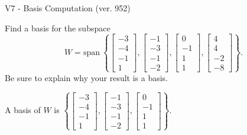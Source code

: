 \begin{exercise}
  \begin{exerciseTitle}V7 - Basis Computation (ver. 952)\end{exerciseTitle}
  \begin{exerciseStatement}
    Find a basis for the subspace 
\[W=\mathrm{span}\ \left\{\left[\begin{array}{r}
-3 \\
-4 \\
-1 \\
1
\end{array}\right] , \left[\begin{array}{r}
-1 \\
-3 \\
-1 \\
-2
\end{array}\right] , \left[\begin{array}{r}
0 \\
-1 \\
1 \\
1
\end{array}\right] , \left[\begin{array}{r}
4 \\
4 \\
-2 \\
-8
\end{array}\right]\right\}.\]
 Be sure to explain why your result is a basis.


  \end{exerciseStatement}
  \begin{exerciseAnswer}
   A basis of \(W\) is  \(\left\{\left[\begin{array}{r}
-3 \\
-4 \\
-1 \\
1
\end{array}\right] , \left[\begin{array}{r}
-1 \\
-3 \\
-1 \\
-2
\end{array}\right] , \left[\begin{array}{r}
0 \\
-1 \\
1 \\
1
\end{array}\right]\right\}\).
  


  \end{exerciseAnswer}
\end{exercise}